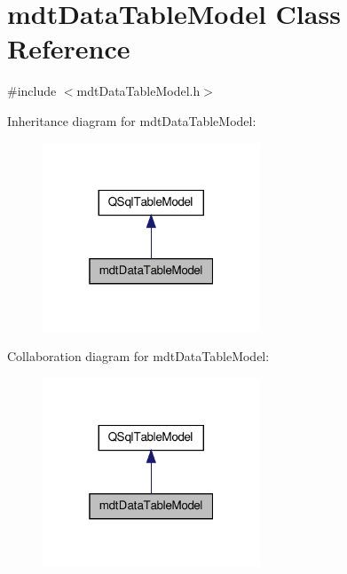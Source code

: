 \hypertarget{classmdt_data_table_model}{\section{mdt\-Data\-Table\-Model Class Reference}
\label{classmdt_data_table_model}
}


{\ttfamily \#include $<$mdt\-Data\-Table\-Model.\-h$>$}



Inheritance diagram for mdt\-Data\-Table\-Model\-:\nopagebreak
\begin{figure}[H]
\begin{center}
\leavevmode
\includegraphics[width=184pt]{classmdt_data_table_model__inherit__graph}
\end{center}
\end{figure}


Collaboration diagram for mdt\-Data\-Table\-Model\-:\nopagebreak
\begin{figure}[H]
\begin{center}
\leavevmode
\includegraphics[width=184pt]{classmdt_data_table_model__coll__graph}
\end{center}
\end{figure}

